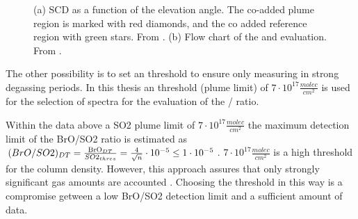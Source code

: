 %
\begin{figure}
	\caption{(a)  SCD as a function of the elevation angle. The co-added plume region is marked with red diamonds, and the co added reference region with green stars. From \cite{WarnachSimon}. (b) Flow chart of the   and  evaluation. From \cite{lubcke2014optical}.}
	\label{fig:algorithm}
\end{figure}
The other possibility is to set an  threshold to ensure only measuring in strong degassing periods. In this thesis an  threshold (plume limit) of $7\cdot 10^{17} \frac{molec}{cm^2}$ is used for the selection of spectra for the evaluation of the / ratio. 

Within the data above a SO2 plume limit of $7\cdot 10^{17} \frac{molec}{cm^2}$ the maximum detection limit of the BrO/SO2 ratio is estimated as $(BrO/SO2)_{DT}	=	\frac{\ce{BrO}_{DT}}{SO2_{thres}}=\frac{4	}{\sqrt{n}}\cdot10^{-5}	 \leq 	1\cdot10^{-5}$.
$7\cdot 10^{17} \frac{molec}{cm^2}$ is a high threshold for the column density. However, this approach assures that only strongly significant gas amounts are accounted \citep{lubcke2014bro}. Choosing the  threshold in this way is a compromise getween a low BrO/SO2 detection limit and a sufficient amount of data.\\

